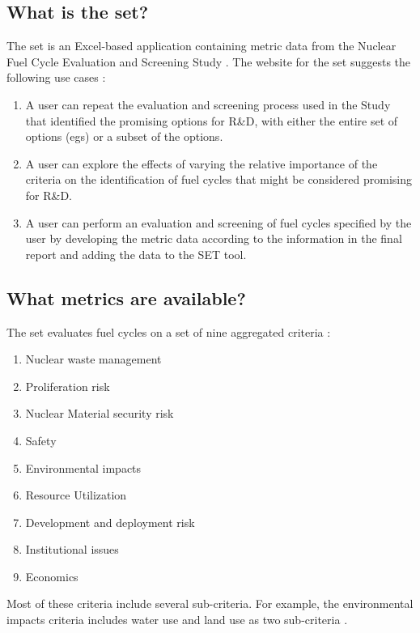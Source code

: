 \subsection{What is the \ac{set}?}

The \ac{set} is an Excel-based application containing metric data from the Nuclear Fuel Cycle Evaluation and Screening Study
\cite{wigeland_nuclear_2014}. The website for the \ac{set} suggests the following use cases \cite{pincock_screening_2014}:
\begin{enumerate}
    \item A user can repeat the evaluation and screening process used in the Study that identified the promising options for R\&D, with either the entire set of options (\acp{eg}) or a subset of the options.
    \item A user can explore the effects of varying the relative importance of the criteria on the identification of fuel cycles that might be considered promising for R\&D.
    \item A user can perform an evaluation and screening of fuel cycles specified by the user by developing the metric data according to the information in the final report and adding the data to the SET tool.
\end{enumerate}

\subsection{What metrics are available?}

The \ac{set} evaluates fuel cycles on a set of nine aggregated criteria \cite{wigeland_nuclear_2014}:
\begin{enumerate}
    \item Nuclear waste management
    \item Proliferation risk
    \item Nuclear Material security risk
    \item Safety
    \item Environmental impacts
    \item Resource Utilization
    \item Development and deployment risk
    \item Institutional issues
    \item Economics
\end{enumerate}

Most of these criteria include several sub-criteria. For example, the environmental impacts criteria 
includes water use and land use as two sub-criteria \cite{wigeland_nuclear_2014-1}.

